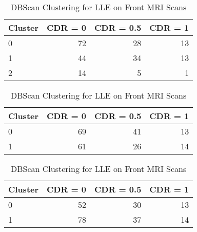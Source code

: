 \begin{table}[h] \centering
\begin{minipage}{0.3\textwidth}

\begin{tabular}{lrrr}
\toprule
Cluster & CDR = 0 & CDR = 0.5 & CDR = 1\\
\midrule
0 & 72 & 28 & 13\\
1 & 44 & 34 & 13\\
2 & 14 & 5 & 1\\
\bottomrule
\end{tabular}
\caption{Kmeans Clustering with 3 Clusters for LLE on Front MRI Scans}
\end{minipage}
\hspace{3cm}
\begin{minipage}{0.3\textwidth}

\begin{tabular}{lrrr}
\toprule
Cluster & CDR = 0 & CDR = 0.5 & CDR = 1\\
\midrule
0 & 69 & 41 & 13\\
1 & 61 & 26 & 14\\
\bottomrule
\end{tabular}
\caption{Kmeans Clustering with 2 Clusters for LLE on Front MRI Scans}
\end{minipage}
\hspace{3cm}
\begin{minipage}{0.3\textwidth}

\begin{tabular}{lrrr}
\toprule
Cluster & CDR = 0 & CDR = 0.5 & CDR = 1\\
\midrule
0 & 52 & 30 & 13\\
1 & 78 & 37 & 14\\
\bottomrule
\end{tabular}
\caption{DBScan Clustering for LLE on Front MRI Scans}
\end{minipage}
\end{table}
